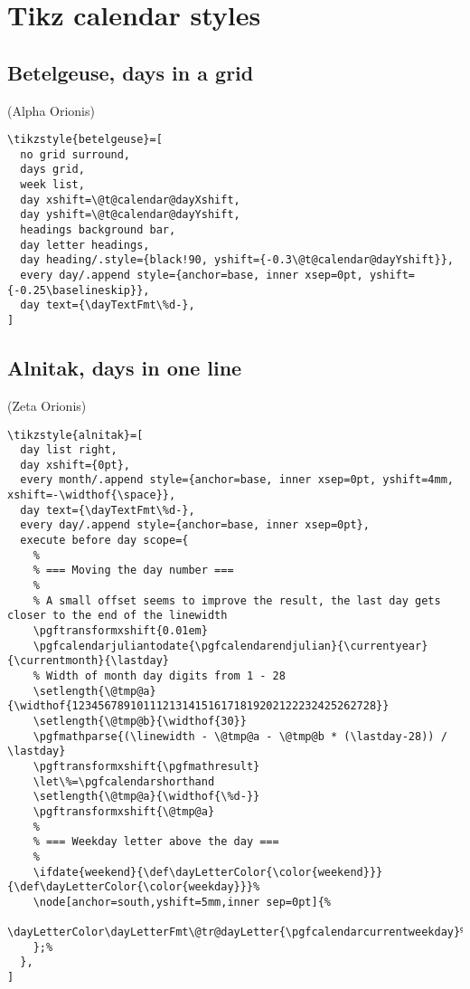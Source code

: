 \documentclass[11pt,oneside]{memoir-article}
\begin{document}
\section{Tikz calendar styles}
\label{sec:org9d1f8e2}
\subsection{Betelgeuse, days in a grid}
\label{sec:org7b7858d}

(Alpha Orionis)

\begin{verbatim}
\tikzstyle{betelgeuse}=[
  no grid surround,
  days grid,
  week list,
  day xshift=\@t@calendar@dayXshift,
  day yshift=\@t@calendar@dayYshift,
  headings background bar,
  day letter headings,
  day heading/.style={black!90, yshift={-0.3\@t@calendar@dayYshift}},
  every day/.append style={anchor=base, inner xsep=0pt, yshift={-0.25\baselineskip}},
  day text={\dayTextFmt\%d-},
]
\end{verbatim}

\subsection{Alnitak, days in one line}
\label{sec:org3b7f33a}

(Zeta Orionis)

\begin{verbatim}
\tikzstyle{alnitak}=[
  day list right,
  day xshift={0pt},
  every month/.append style={anchor=base, inner xsep=0pt, yshift=4mm, xshift=-\widthof{\space}},
  day text={\dayTextFmt\%d-},
  every day/.append style={anchor=base, inner xsep=0pt},
  execute before day scope={
    %
    % === Moving the day number ===
    %
    % A small offset seems to improve the result, the last day gets closer to the end of the linewidth
    \pgftransformxshift{0.01em}
    \pgfcalendarjuliantodate{\pgfcalendarendjulian}{\currentyear}{\currentmonth}{\lastday}
    % Width of month day digits from 1 - 28
    \setlength{\@tmp@a}{\widthof{12345678910111213141516171819202122232425262728}}
    \setlength{\@tmp@b}{\widthof{30}}
    \pgfmathparse{(\linewidth - \@tmp@a - \@tmp@b * (\lastday-28)) / \lastday}
    \pgftransformxshift{\pgfmathresult}
    \let\%=\pgfcalendarshorthand
    \setlength{\@tmp@a}{\widthof{\%d-}}
    \pgftransformxshift{\@tmp@a}
    %
    % === Weekday letter above the day ===
    %
    \ifdate{weekend}{\def\dayLetterColor{\color{weekend}}}{\def\dayLetterColor{\color{weekday}}}%
    \node[anchor=south,yshift=5mm,inner sep=0pt]{%
      \dayLetterColor\dayLetterFmt\@tr@dayLetter{\pgfcalendarcurrentweekday}%
    };%
  },
]
\end{verbatim}
\end{document}
